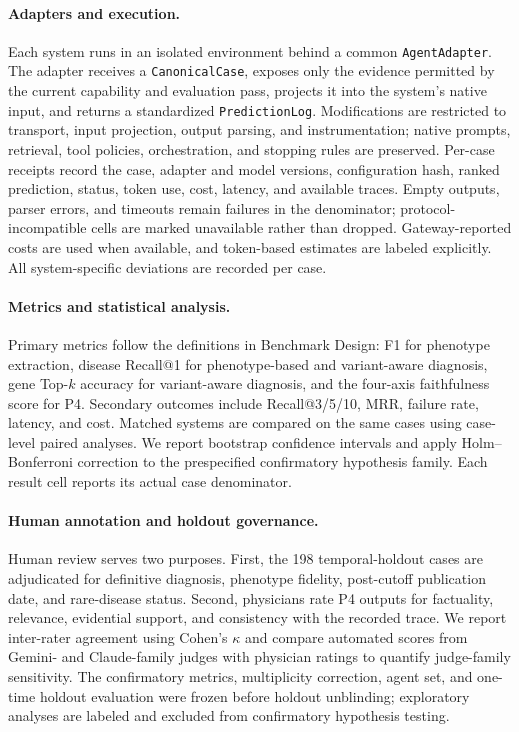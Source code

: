 \documentclass[letterpaper]{article} %
\begin{document}
\paragraph{Adapters and execution.}
\label{sec-5-3}
Each system runs in an isolated environment behind a common
\texttt{AgentAdapter}. The adapter receives a \texttt{CanonicalCase}, exposes
only the evidence permitted by the current capability and evaluation pass,
projects it into the system's native input, and returns a standardized
\texttt{PredictionLog}. Modifications are restricted to transport, input
projection, output parsing, and instrumentation; native prompts, retrieval,
tool policies, orchestration, and stopping rules are preserved. Per-case
receipts record the case, adapter and model versions, configuration hash,
ranked prediction, status, token use, cost, latency, and available traces.
Empty outputs, parser errors, and timeouts remain failures in the denominator;
protocol-incompatible cells are marked unavailable rather than dropped.
Gateway-reported costs are used when available, and token-based estimates are
labeled explicitly. All system-specific deviations are recorded per case.

\paragraph{Metrics and statistical analysis.}
Primary metrics follow the definitions in Benchmark Design: F1 for phenotype
extraction, disease Recall@1 for phenotype-based and variant-aware diagnosis,
gene Top-$k$ accuracy for variant-aware diagnosis, and the four-axis
faithfulness score for P4. Secondary outcomes include Recall@3/5/10, MRR,
failure rate, latency, and cost. Matched systems are compared on the same cases
using case-level paired analyses. We report bootstrap confidence intervals
and apply Holm--Bonferroni correction to the prespecified confirmatory
hypothesis family. Each result cell reports its actual case denominator.

\paragraph{Human annotation and holdout governance.}
\label{sec-5-4}
Human review serves two purposes. First, the 198 temporal-holdout cases are
adjudicated for definitive diagnosis, phenotype fidelity, post-cutoff
publication date, and rare-disease status. Second, physicians rate P4 outputs
for factuality, relevance, evidential support, and consistency with the
recorded trace. We report inter-rater agreement using Cohen's $\kappa$ and
compare automated scores from Gemini- and Claude-family judges with physician
ratings to quantify judge-family sensitivity. The confirmatory metrics,
multiplicity correction, agent set, and one-time holdout evaluation were
frozen before holdout unblinding; exploratory analyses are labeled and
excluded from confirmatory hypothesis testing.
\end{document}
